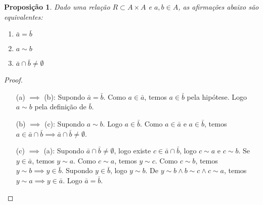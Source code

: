 \documentclass{article}
\theoremstyle{plain}
\newtheorem{prop}{Proposição}[section]
\theoremstyle{definition}
\theoremstyle{remark}
\begin{document}
\begin{prop}
	Dado uma relação $R \subset A \times A$ e $a,b\in A$, as afirmações abaixo são equivalentes:
	\begin{enumerate}[label = (\alph*)]
		\item  $\bar{a} = \bar{b}$
		\item  $ a\sim b$
		\item  $ \bar{a} \cap \bar{b} \neq \emptyset$
	\end{enumerate}
\end{prop}
\begin{proof}
	\begin{enumerate}[itemindent=36pt]
		\item[(a) $\implies$ (b):] Supondo $\bar{a} = \bar{b}$. Como $a\in \bar{a}$, temos $a\in \bar{b}$ pela hipótese. Logo $a \sim b$ pela definição de $\bar{b}$.
		\item[(b) $\implies$ (c):] Supondo $a\sim b$.  Logo $a\in \bar{b}$. Como $a\in \bar{a}$ e $a\in \bar{b}$, temos $a\in \bar{a} \cap \bar{b} \implies \bar{a} \cap \bar{b} \neq\emptyset$.
		\item[(c) $\implies$ (a):] Supondo $\bar{a} \cap \bar{b} \neq \emptyset$, logo existe $c\in  \bar{a} \cap \bar{b}$, logo $c\sim a$ e $c\sim b$. Se $y \in \bar{a}$, temos $ y\sim a$. Como $c\sim a$, temos $y\sim c$. Como $c\sim b$, temos $y\sim b \implies y\in \bar{b}$. Supondo $y\in \bar{b}$, logo $y\sim b$. De $y\sim b \land b\sim c \land c \sim a$, temos $y\sim a \implies y\in \bar{a}$. Logo $\bar{a} = \bar{b}$.
	\end{enumerate}
\end{proof}
\end{document}

